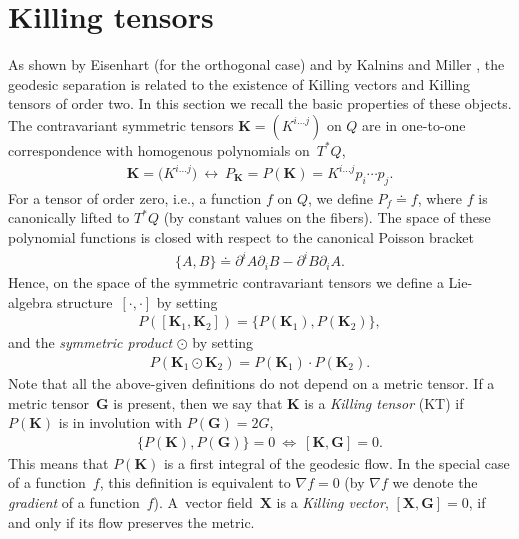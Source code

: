 \documentclass[10pt,a4paper]{amsart}
\def\bs{\boldsymbol}
\numberwithin{equation}{section}
\begin{document}
\section{Killing tensors}\label{section2}

As shown by Eisenhart \cite{Eisenhart-1934,Eisenhart-1949} (for the orthogonal case) and by Kalnins and Miller \cite{KM-1980,KM-1981}, the geodesic separation is related to the existence of Killing vectors and Killing tensors of order two. In this section we recall the basic properties of these objects.
The contravariant symmetric tensors $\bs K=(K^{i\ldots j})$ on $Q$ are in one-to-one correspondence with homogenous polynomials on~$T^*Q$,
\begin{gather*}
{\bs K}=\big(K^{i\ldots j}\big)\ \longleftrightarrow \  P_{{\bs K}}=P(\bs K)=K^{i\ldots j} p_i\cdots p_j.
\end{gather*}
For a tensor of order zero, i.e., a function $f$ on $Q$, we def\/ine $P_f\doteq f$, where $f$ is canonically lifted to $T^*Q$ (by constant values on the f\/ibers). The space of these polynomial functions is closed with respect to  the canonical Poisson bracket
\begin{gather*}
\{A,B\}\doteq \partial^iA \partial_iB-\partial^iB \partial_iA.
\end{gather*}
Hence, on the space of the symmetric contravariant tensors we def\/ine a Lie-algebra structu\-re~$[\cdot,\cdot]$ by setting
\begin{gather*}
P([{\bs K}_1,{\bs K}_2])=\{P({\bs K}_1),P({\bs K}_2)\},
\end{gather*}
and the {\it symmetric product} $\odot$ by setting
\begin{gather*}
P({\bs K}_1\odot{\bs K}_2)=P({\bs K}_1)\cdot P({\bs K}_2).
\end{gather*}
Note that all the above-given def\/initions do not depend on a metric tensor.
If a metric tensor~$\bs G$ is present, then we say that $\bs K$ is a {\it Killing tensor} (KT) if $P(\bs K)$ is in involution with $P(\bs G)=2G$,
\begin{gather}
\{P(\bs K),P(\bs G)\}=0\ \Longleftrightarrow\  [\bs K,\bs G]=0.
\label{(2.1)}
\end{gather}
This means that $P(\bs K)$ is a f\/irst integral of the geodesic f\/low.
In the special case of a function~$f$, this def\/inition is equivalent to $\nabla f=0$ (by $\nabla f$ we denote the {\it gradient} of a function~$f$). A~vector f\/ield~$\bs X$ is a {\it Killing vector}, $[\bs X,\bs G]=0$, if and only if its f\/low preserves the metric.
\end{document}
